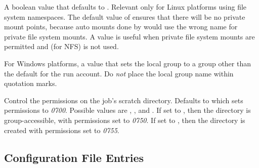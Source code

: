 \begin{description}
\label{param:PerJobNamespaces} 
\item[ \Macro{PER\_JOB\_NAMESPACES}]
  A boolean value that defaults to .
  Relevant only for Linux platforms using file system namespaces.
  The default value of  ensures that there will be no
  private mount points, because auto mounts done by  
  would use the wrong name for private file system mounts. 
  A  value is useful when private file system mounts are
  permitted and  (for NFS) is not used.

\label{param:DynamicRunAccountLocalGroup} 
\item[\Macro{DYNAMIC\_RUN\_ACCOUNT\_LOCAL\_GROUP}]
  For Windows platforms, a value that sets the local group to a group other 
  than the default  for the  run account.
  Do \emph{not} place the local group name within quotation marks.

\label{param:JobExecdirPermissions}
\item[\Macro{JOB\_EXECDIR\_PERMISSIONS}]
  Control the permissions on the job's scratch directory. Defaults to
   which sets permissions to \emph{0700}. Possible values are
  , , and . 
  If set to , then the directory is group-accessible, 
  with permissions set to \emph{0750}.
  If set to ,
  then the directory is created with permissions set to \emph{0755}.


\end{description}

\subsection{\label{sec:Submit-Config-File-Entries}
Configuration File Entries}

